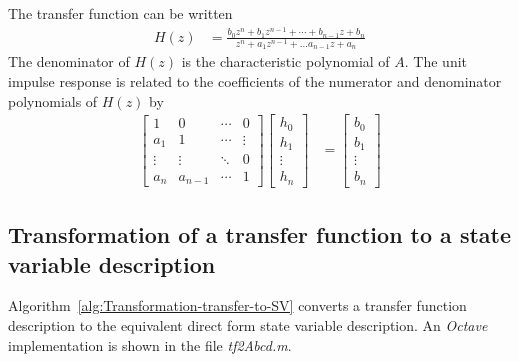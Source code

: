 \documentclass[a4paper,twoside,10pt,english]{report}
\begin{document}
The transfer function can be written
\begin{align}
H\left(z\right) &= \frac{b_{0}z^{n}+b_{1}z^{n-1}+\cdots+b_{n-1}z+b_{n}}
                        {z^{n}+a_{1}z^{n-1}+\ldots a_{n-1}z+a_{n}}
\label{eqn:rational-transfer-function}
\end{align}
The denominator of $H\left(z\right)$ is the characteristic polynomial of $A$.
The unit impulse response is related to the coefficients of the
numerator and denominator polynomials of $H\left(z\right)$ by
\begin{align*}
\left[\begin{array}{cccc}
1 & 0 & \cdots & 0\\
a_{1} & 1 & \cdots & \vdots\\
\vdots & \vdots & \ddots & 0\\
a_{n} & a_{n-1} & \cdots & 1
\end{array}\right]\left[\begin{array}{c}
h_{0}\\
h_{1}\\
\vdots\\
h_{n}
\end{array}\right] &=  \left[\begin{array}{c}
b_{0}\\
b_{1}\\
\vdots\\
b_{n}
\end{array}\right]
\end{align*}
\subsection{Transformation of a transfer function to a state variable 
description}
\label{sec:transform-transform-function-to-state-variable}
Algorithm~\ref{alg:Transformation-transfer-to-SV} converts a transfer function
description to the equivalent direct form state variable description. An 
\emph{Octave} implementation is shown in the file \emph{tf2Abcd.m}.
\end{document}
